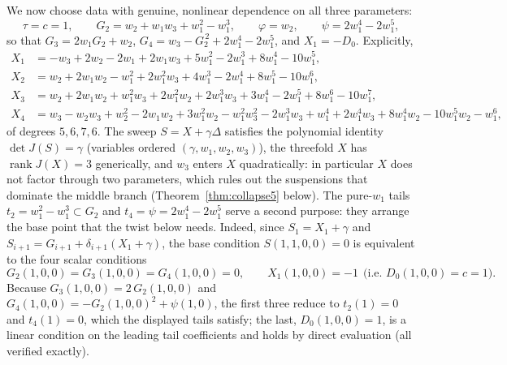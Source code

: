 \documentclass[11pt]{article}
\theoremstyle{plain}
\theoremstyle{definition}
\theoremstyle{remark}
\begin{document}
We now choose data with genuine, nonlinear dependence on all three
parameters:
\[
\tau=c=1,\qquad
G_2=w_2+w_1w_3+w_1^2-w_1^3,\qquad
\varphi=w_2,\qquad
\psi=2w_1^4-2w_1^5 ,
\]
so that $G_3=2w_1G_2+w_2$, $G_4=w_3-G_2^{\,2}+2w_1^4-2w_1^5$, and
$X_1=-D_0$. Explicitly,
\begin{align*}
X_1&=-w_3+2w_2-2w_1+2w_1w_3+5w_1^2-2w_1^3+8w_1^4-10w_1^5,\\
X_2&=w_2+2w_1w_2-w_1^2+2w_1^2w_3+4w_1^3-2w_1^4+8w_1^5-10w_1^6,\\
X_3&=w_2+2w_1w_2+w_1^2w_3+2w_1^2w_2+2w_1^3w_3+3w_1^4-2w_1^5+8w_1^6-10w_1^7,\\
X_4&=w_3-w_2w_3+w_2^2-2w_1w_2+3w_1^2w_2-w_1^2w_3^2-2w_1^3w_3+w_1^4+2w_1^4w_3+8w_1^4w_2-10w_1^5w_2-w_1^6 ,
\end{align*}
of degrees $5,6,7,6$. The sweep $S=X+\gamma\Delta$ satisfies the polynomial
identity $\det J(S)=\gamma$ (variables ordered $(\gamma,w_1,w_2,w_3)$), the
threefold $X$ has $\operatorname{rank}J(X)=3$ generically, and $w_3$ enters $X$
quadratically: in particular $X$ does not factor through two parameters, which
rules out the suspensions that dominate the middle branch
(Theorem~\ref{thm:collapse5} below). The pure-$w_1$ tails
$t_2=w_1^2-w_1^3\subset G_2$ and $t_4=\psi=2w_1^4-2w_1^5$ serve a second
purpose: they arrange the base point that the twist below needs. Indeed, since
$S_1=X_1+\gamma$ and $S_{i+1}=G_{i+1}+\delta_{i+1}(X_1+\gamma)$, the base
condition $S(1,1,0,0)=0$ is equivalent to the four scalar conditions
\[
G_2(1,0,0)=G_3(1,0,0)=G_4(1,0,0)=0,\qquad
X_1(1,0,0)=-1\ \ \text{(i.e.\ }D_0(1,0,0)=c=1\text{)}.
\]
Because $G_3(1,0,0)=2\,G_2(1,0,0)$ and $G_4(1,0,0)=-G_2(1,0,0)^2+\psi(1,0)$,
the first three reduce to $t_2(1)=0$ and $t_4(1)=0$, which the displayed tails
satisfy; the last, $D_0(1,0,0)=1$, is a linear condition on the leading tail
coefficients and holds by direct evaluation (all verified exactly).
\end{document}
